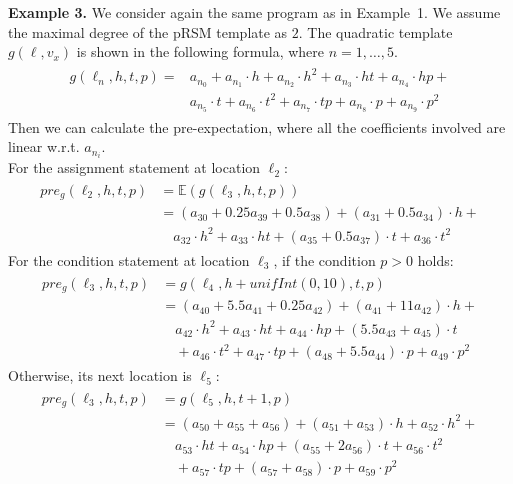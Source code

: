 \documentclass[conference]{IEEEtran}
\begin{document}
\textbf{Example 3.} We consider again the same program as in Example~1. We assume the maximal degree of the pRSM template as $2$. The quadratic template $g(\ell, v_x)$ is shown in the following formula, where $n=1,\ldots,5$. 
\begin{align*}%
\begin{split}
g(\ell_n,h,t,p)=&a_{n_0}+a_{n_1}\!\cdot \!h+a_{n_2}\!\cdot \!h^{2}+a_{n_3}\cdot \!ht +a_{n_4}\cdot \!hp+\\
&a_{n_5}\cdot\! t +a_{n_6}\cdot\! t^{2}+a_{n_7}\cdot\! tp+a_{n_8}\cdot\! p+a_{n_9}\cdot\! p^{2}
\end{split}
\end{align*}
Then we can calculate the pre-expectation, where all the coefficients involved are linear w.r.t. $a_{n_i}$.\\ For the assignment statement at location $\ell_2$:
 \begin{align*}
 \begin{split}
 pre_g(\ell_2,h,t,p)&=\mathbb{E}(g(\ell_3,h,t,p)) \\
 &=\!(a_{30}\!+0.25a_{39}\!+0.5a_{38}\!)\!+\!(a_{31}\!+\!0.5a_{34})\cdot \!h+ \\
 &\quad a_{32}\cdot \!h^{2}\!+\!a_{33}\cdot ht\!+(a_{35}\!+\!0.5a_{37})\cdot t\!+a_{36}\cdot t^{2}  
 \end{split}
 \end{align*}
 For the condition statement at location $\ell_3$, if the condition $p>0$ holds:
 \begin{align*}
 \begin{split}
 pre_g(\!\ell_3,h,t,p\!)&\!=g(\ell_4,h+unifInt(0,10),t,p) \\
 &\!=\!(a_{40}\!+\!5.5a_{41}\!+\!0.25a_{42})\!+\!(a_{41}\!+\!11a_{42})\!\cdot\! h+ \\
 &\quad\!a_{42}\!\cdot\! h^{2}\!+\!a_{43}\!\cdot\!ht\!+\!a_{44}\!\cdot\! hp+(5.5a_{43}\!+\!a_{45})\!\cdot\! t \\
 &\quad\!+\! a_{46}\!\cdot\! t^{2}\!+\!a_{47}\!\cdot\! tp +(a_{48}\!+\!5.5a_{44})\!\cdot\! p\!+\!a_{49}\!\cdot\! p^{2} 
 \end{split}
 \end{align*}
 Otherwise, its next location is $\ell_5$:
 \begin{align*}
 \begin{split}
 pre_g(\ell_3,h,t,p)&=g(\ell_5,h,t+1,p) \\
 &\!=\!(a_{50}\!+\!a_{55}\!+\!a_{56})\!+\!(a_{51}\!+\!a_{53})\cdot h\!+\!a_{52}\cdot h^{2}+\\
 &\quad a_{53}\cdot ht\!+a_{54}\cdot hp\!+(a_{55}+2a_{56})\!\cdot\! t\!+\!a_{56}\cdot t^{2} \\
 &\quad +a_{57}\cdot tp+(a_{57}+a_{58})\cdot p+a_{59}\cdot p^{2}
 \end{split}
 \end{align*}
 
\end{document}
